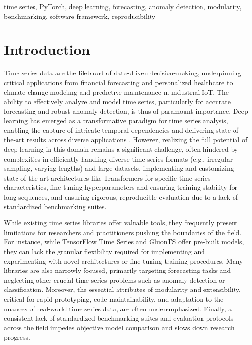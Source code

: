 \documentclass[twoside,11pt]{article}
\begin{document}
\begin{keywords}
  time series, PyTorch, deep learning, forecasting, anomaly detection, modularity, benchmarking, software framework, reproducibility
\end{keywords}


\section{Introduction}
Time series data are the lifeblood of data-driven decision-making, underpinning critical applications from financial forecasting and personalized healthcare to climate change modeling and predictive maintenance in industrial IoT.  The ability to effectively analyze and model time series, particularly for accurate forecasting and robust anomaly detection, is thus of paramount importance. Deep learning has emerged as a transformative paradigm for time series analysis, enabling the capture of intricate temporal dependencies and delivering state-of-the-art results across diverse applications \citep{lim2021time}. However, realizing the full potential of deep learning in this domain remains a significant challenge, often hindered by complexities in efficiently handling diverse time series formats (e.g., irregular sampling, varying lengths) and large datasets, implementing and customizing state-of-the-art architectures like Transformers for specific time series characteristics, fine-tuning hyperparameters and ensuring training stability for long sequences, and ensuring rigorous, reproducible evaluation due to a lack of standardized benchmarking suites.

While existing time series libraries offer valuable tools, they frequently present limitations for researchers and practitioners pushing the boundaries of the field.  For instance, while TensorFlow Time Series \citep{abadi2016tensorflow} and GluonTS \citep{gluonts2020} offer pre-built models, they can lack the granular flexibility required for implementing and experimenting with novel architectures or fine-tuning training procedures.  Many libraries are also narrowly focused, primarily targeting forecasting tasks \citep{lim2021time} and neglecting other crucial time series problems such as anomaly detection or classification.  Moreover, the essential attributes of modularity and extensibility, critical for rapid prototyping, code maintainability, and adaptation to the nuances of real-world time series data, are often underemphasized.  Finally, a consistent lack of standardized benchmarking suites and evaluation protocols across the field impedes objective model comparison and slows down research progress.
\end{document}
